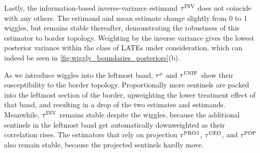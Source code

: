 	Lastly, the information-based inverse-variance estimand \(\tau^{\mathrm{INV}}\) does not coincide with any others.
The estimand and mean estimate change slightly from 0 to 1 wiggles, but remains stable thereafter, demonstrating the robustness of this estimator to border topology.
Weighting by the inverse variance gives the lowest posterior variance within the class of LATEs under consideration, which can indeed be seen in \autoref{fig:wiggly_boundaries_posteriors}(b).

	As we introduce wiggles into the leftmost band,
\(\tau^{\rho}\) and \(\tau^{\mathrm{UNIF}}\) show their susceptibility to the border topology.
Proportionally more sentinels are packed into the leftmost section of the border,
upweighting the lower treatment effect of that band,
and resulting in a drop of the two estimates and estimands.
Meanwhile, \(\tau^{\mathrm{INV}}\) remains stable despite the wiggles,
because the additional sentinels in the leftmost
band get automatically downweighted as their correlation rises.
The estimators that rely on projection
\(\tau^{\mathrm{PROJ}}\), \(\tau^{\mathrm{GEO}}\), and \(\tau^{\mathrm{POP}}\) also remain stable,
because the projected sentinels hardly move.
    
